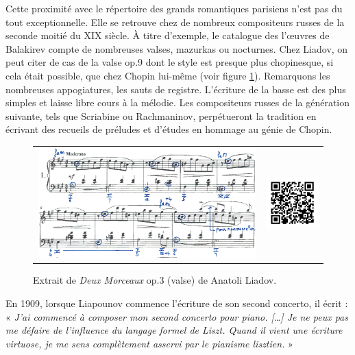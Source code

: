 Cette proximité avec le répertoire des grands romantiques parisiens n'est pas du tout exceptionnelle. Elle se retrouve chez de nombreux compositeurs russes de la seconde moitié du XIX\ieme{} siècle. À titre d'exemple, le catalogue des l'œuvres de Balakirev compte de nombreuses valses, mazurkas ou nocturnes. Chez Liadov, on peut citer de cas de la valse op.9  dont le style est presque plus chopinesque, si cela était possible, que chez Chopin lui-même (voir figure \ref{liadov}). Remarquons les nombreuses appogiatures, les sauts de registre. L'écriture de la basse est des plus simples et laisse libre cours à la mélodie. Les compositeurs russes de la génération suivante, tels que Scriabine ou Rachmaninov, perpétueront la tradition en écrivant des recueils de préludes et d'études en hommage au génie de Chopin.\\

\vspace*{-0.25cm}

\begin{figure}[!ht]
  \begin{bigcenter}
    \begin{tabular}{lr}
      \includegraphics[width=12.5cm, keepaspectratio]{liadov.png}
      &
      \includegraphics[width=3cm, keepaspectratio]{liadov-qr.png}
    \end{tabular}
  \end{bigcenter}
  \caption{\label{liadov}Extrait de \emph{Deux Morceaux} op.3  (valse) de Anatoli Liadov.}
\end{figure}

\indent En 1909, lorsque Liapounov commence l'écriture de son second concerto, il écrit :\\
\indent« \emph{J'ai commencé à composer mon second concerto pour piano. [\dots] Je ne peux pas me défaire de l'influence du langage formel de Liszt. Quand il vient une écriture virtuose, je me sens complètement asservi par le pianisme lisztien.} »\\

